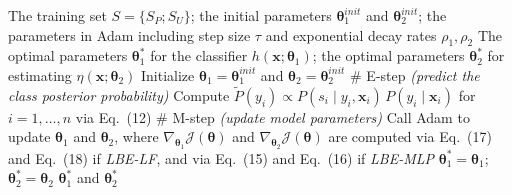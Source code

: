\documentclass{article}
\begin{document}
\begin{algorithm}[!h]
\renewcommand{\algorithmicrequire}{\textbf{Input:}} %
\renewcommand{\algorithmicensure}{\textbf{Output:}} %
	\caption{LBE (instance-dependent PU learning with labeling bias estimation)} %
	\begin{algorithmic}[1] %
	    \REQUIRE
	    The training set $S=\{S_{P};S_{U}\}$; the initial parameters
	    $\boldsymbol{\theta}_{1}^{init}$ and $\boldsymbol{\theta}_{2}^{init}$;
	    the parameters in Adam including step size $\tau$ and exponential decay rates
	    $\rho_{1},\rho_{2}$
	    \ENSURE
	    The optimal parameters $\boldsymbol{\theta}_{1}^{\ast}$ for the classifier
	    $h(\mathbf{x};\boldsymbol{\theta}_{1})$; the optimal parameters
	    $\boldsymbol{\theta}_{2}^{\ast}$ for estimating $\eta(\mathbf{x};\boldsymbol{\theta}_{2})$
	    \STATE Initialize $\boldsymbol{\theta}_{1}=\boldsymbol{\theta}_{1}^{init}$ and
	    $\boldsymbol{\theta}_{2}=\boldsymbol{\theta}_{2}^{init}$
	    \STATE \# E-step \emph{(predict the class posterior probability)}
	    \STATE Compute $\tilde{P}(y_{i})\propto P(s_{i}\mid y_{i},\mathbf{x}_{i})\,P(y_{i}\mid\mathbf{x}_{i})$
	    for $i=1,\dots,n$ via Eq.~(12) %
	    \STATE \# M-step \emph{(update model parameters)}
	    \STATE Call Adam to update $\boldsymbol{\theta}_{1}$ and $\boldsymbol{\theta}_{2}$, where
	    $\nabla_{\boldsymbol{\theta}_{1}}\mathcal{J}(\boldsymbol{\theta})$ and
	    $\nabla_{\boldsymbol{\theta}_{2}}\mathcal{J}(\boldsymbol{\theta})$ are computed via
	    Eq.~(17) and Eq.~(18) if \emph{LBE-LF}, and via Eq.~(15) and Eq.~(16) if \emph{LBE-MLP} %
	    \ENDWHILE
	    \STATE $\boldsymbol{\theta}_{1}^{\ast}=\boldsymbol{\theta}_{1}$;\quad
	    $\boldsymbol{\theta}_{2}^{\ast}=\boldsymbol{\theta}_{2}$
		\RETURN $\boldsymbol{\theta}_{1}^{\ast}$ and $\boldsymbol{\theta}_{2}^{\ast}$
	\end{algorithmic}
\end{algorithm}
\end{document}
